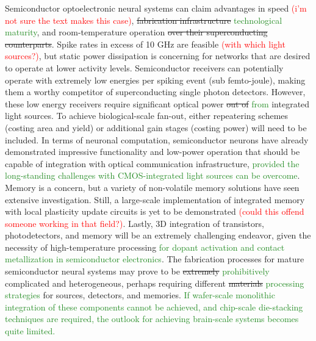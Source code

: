 \documentclass[twocolumn]{article}
\begin{document}
Semiconductor optoelectronic neural systems can claim advantages in speed \textcolor{red}{(i'm not sure the text makes this case)}, \sout{fabrication infrastructure} \textcolor{ForestGreen}{technological maturity}, and room-temperature operation \sout{over their superconducting counterparts}. Spike rates in excess of 10 GHz are feasible \textcolor{red}{(with which light sources?)}, but static power dissipation is concerning for networks that are desired to operate at lower activity levels. Semiconductor receivers can potentially operate with extremely low energies per spiking event (sub femto-joule), making them a worthy competitor of superconducting single photon detectors. However, these low energy receivers require significant optical power \sout{out of} \textcolor{ForestGreen}{from} integrated light sources. To achieve biological-scale fan-out, either repeatering schemes (costing area and yield) or additional gain stages (costing power) will need to be included. In terms of neuronal computation, semiconductor neurons have already demonstrated impressive functionality and low-power operation that should be capable of integration with optical communication infrastructure, \textcolor{ForestGreen}{provided the long-standing challenges with CMOS-integrated light sources can be overcome}. Memory is a concern, but a variety of non-volatile memory solutions have seen extensive investigation. Still, a large-scale implementation of integrated memory with local plasticity update circuits is yet to be demonstrated \textcolor{red}{(could this offend someone working in that field?)}. Lastly, 3D integration of transistors, photodetectors, and memory will be an extremely challenging endeavor, given the necessity of high-temperature processing \textcolor{ForestGreen}{for dopant activation and contact metallization in semiconductor electronics}. The fabrication processes for mature semiconductor neural systems may prove to be \sout{extremely} \textcolor{ForestGreen}{prohibitively} complicated and heterogeneous, perhaps requiring different \sout{materials} \textcolor{ForestGreen}{processing strategies} for sources, detectors, and memories. \textcolor{ForestGreen}{If wafer-scale monolithic integration of these components cannot be achieved, and chip-scale die-stacking techniques are required, the outlook for achieving brain-scale systems becomes quite limited.}
\end{document}
